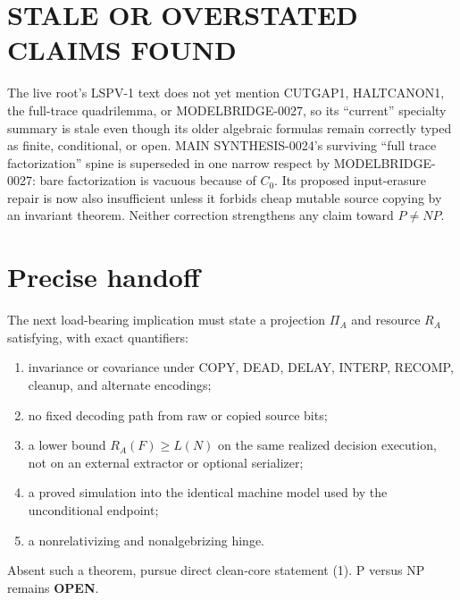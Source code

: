 \documentclass[11pt]{article}
\newcommand{\OPEN}{\textbf{OPEN}}
\begin{document}
\section{STALE OR OVERSTATED CLAIMS FOUND}
The live root's LSPV-1 text does not yet mention CUTGAP1, HALTCANON1, the
full-trace quadrilemma, or MODELBRIDGE-0027, so its ``current'' specialty
summary is stale even though its older algebraic formulas remain correctly
typed as finite, conditional, or open.  MAIN SYNTHESIS-0024's surviving
``full trace factorization'' spine is superseded in one narrow respect by
MODELBRIDGE-0027: bare factorization is vacuous because of $C_0$.  Its proposed
input-erasure repair is now also insufficient unless it forbids cheap mutable
source copying by an invariant theorem.  Neither correction strengthens any
claim toward $P\ne NP$.

\section{Precise handoff}
The next load-bearing implication must state a projection $\Pi_A$ and resource
$R_A$ satisfying, with exact quantifiers:
\begin{enumerate}[leftmargin=*]
\item invariance or covariance under COPY, DEAD, DELAY, INTERP, RECOMP,
cleanup, and alternate encodings;
\item no fixed decoding path from raw or copied source bits;
\item a lower bound $R_A(F)\ge L(N)$ on the same realized decision execution,
not on an external extractor or optional serializer;
\item a proved simulation into the identical machine model used by the
unconditional endpoint;
\item a nonrelativizing and nonalgebrizing hinge.
\end{enumerate}
Absent such a theorem, pursue direct clean-core statement (1).  P versus NP
remains \OPEN.

\end{document}
